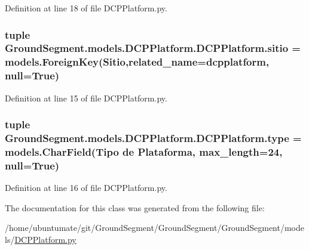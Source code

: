 Definition at line 18 of file D\+C\+P\+Platform.\+py.

\hypertarget{class_ground_segment_1_1models_1_1_d_c_p_platform_1_1_d_c_p_platform_a40c6a8b2d8b8ff4122c8544088abbc4f}{}
\subsubsection[{sitio}]{\setlength{\rightskip}{0pt plus 5cm}tuple Ground\+Segment.\+models.\+D\+C\+P\+Platform.\+D\+C\+P\+Platform.\+sitio = models.\+Foreign\+Key({\bf Sitio},related\+\_\+name=\textquotesingle{}dcpplatform\textquotesingle{}, null=True)\hspace{0.3cm}{\ttfamily [static]}}\label{class_ground_segment_1_1models_1_1_d_c_p_platform_1_1_d_c_p_platform_a40c6a8b2d8b8ff4122c8544088abbc4f}


Definition at line 15 of file D\+C\+P\+Platform.\+py.

\hypertarget{class_ground_segment_1_1models_1_1_d_c_p_platform_1_1_d_c_p_platform_afc4749d3d62ae4e61dc88282b464acd5}{}
\subsubsection[{type}]{\setlength{\rightskip}{0pt plus 5cm}tuple Ground\+Segment.\+models.\+D\+C\+P\+Platform.\+D\+C\+P\+Platform.\+type = models.\+Char\+Field(\textquotesingle{}Tipo de Plataforma\textquotesingle{}, max\+\_\+length=24, null=True)\hspace{0.3cm}{\ttfamily [static]}}\label{class_ground_segment_1_1models_1_1_d_c_p_platform_1_1_d_c_p_platform_afc4749d3d62ae4e61dc88282b464acd5}


Definition at line 16 of file D\+C\+P\+Platform.\+py.



The documentation for this class was generated from the following file\+:\begin{DoxyCompactItemize}
\item 
/home/ubuntumate/git/\+Ground\+Segment/\+Ground\+Segment/\+Ground\+Segment/models/\hyperlink{_d_c_p_platform_8py}{D\+C\+P\+Platform.\+py}\end{DoxyCompactItemize}
